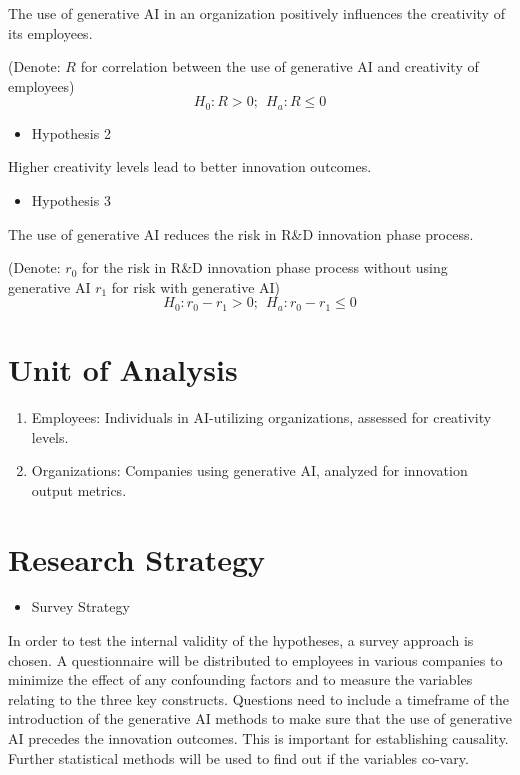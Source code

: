 \documentclass[UTF8,a4paper,AutoFakeBold,AutoFakeSlant]{article}
\begin{document}
The use of generative AI in an organization positively influences the creativity of its employees.

(Denote: $R$ for correlation between the use of generative AI and creativity of employees)
\begin{equation}
    H_0: R>0; ~~H_a: R\leq 0
\end{equation}

\begin{itemize}
    \item Hypothesis 2
\end{itemize}

Higher creativity levels lead to better innovation outcomes.

\begin{itemize}
    \item Hypothesis 3
\end{itemize}

The use of generative AI reduces the risk in R\&D innovation phase process.

(Denote: $r_0$ for the risk in R\&D innovation phase process without using generative AI
$r_1$ for risk with generative AI)
\begin{equation}
    H_0: r_0-r_1>0; ~~H_a: r_0-r_1 \leq 0
\end{equation}


\section{Unit of Analysis}

\begin{enumerate}
    \item Employees: Individuals in AI-utilizing organizations, assessed for creativity levels.
    \item Organizations: Companies using generative AI, analyzed for innovation output metrics.
\end{enumerate}


\section{Research Strategy}

\begin{itemize}
    \item Survey Strategy
\end{itemize}

In order to test the internal validity of the hypotheses, a survey approach is chosen. A questionnaire will be distributed to employees in various companies to minimize the effect of any confounding factors and to measure the variables relating to the three key constructs. Questions need to include a timeframe of the introduction of the generative AI methods to make sure that the use of generative AI precedes the innovation outcomes. This is important for establishing causality. Further statistical methods will be used to find out if the variables co-vary. 
\end{document}
